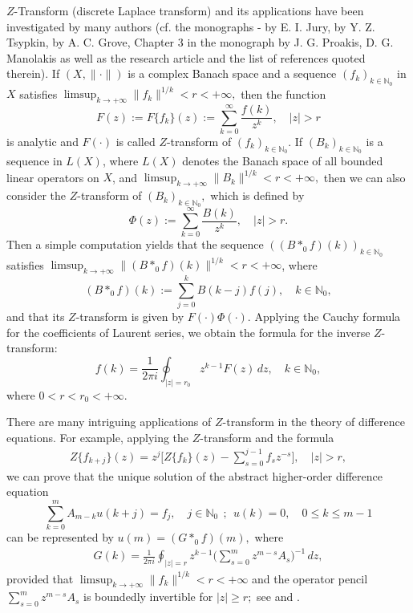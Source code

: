 \documentclass{amsart}
\theoremstyle{definition}
\theoremstyle{remark}
\numberwithin{equation}{section}
\begin{document}
$Z$-Transform  (discrete Laplace transform) and its applications have been investigated by many authors (cf. the  monographs \cite{jury1}-\cite{jury} by  E. I. Jury, \cite{chip} by Y. Z. Tsypkin, \cite{grove} by A. C. Grove, Chapter 3 in the monograph \cite{4949} by J. G. Proakis, D. G. Manolakis as well as the research article \cite{bohnert} and  the list of references quoted therein). 
If $(X,\| \cdot \|)$ is a complex Banach space and a sequence $(f_{k})_{k\in {\mathbb N}_{0}}$ in $X$ satisfies $\limsup_{k\rightarrow +\infty}\| f_{k}\|^{1/k}<r<+\infty,$ then the function
$$
F(z):=F\bigl\{f_{k}\bigr\}(z):=\sum_{k=0}^{\infty}\frac{f(k)}{z^{k}},\quad |z|>r
$$
is analytic and $F(\cdot)$ is called $Z$-transform of $(f_{k})_{k\in {\mathbb N}_{0}}.$ If $(B_{k})_{k\in {\mathbb N}_{0}}$ is a sequence in $L(X)$, where $L(X)$ denotes the Banach space of all bounded linear operators on $X$, and $\limsup_{k\rightarrow +\infty}\| B_{k}\|^{1/k}<r<+\infty,$ then we can also consider the $Z$-transform of $(B_{k})_{k\in {\mathbb N}_{0}},$ which is defined by
$$
\Phi(z):=\sum_{k=0}^{\infty}\frac{B(k)}{z^{k}},\quad |z|>r.
$$
Then a simple computation yields that the sequence $((B\ast_{0} f)(k))_{k\in {\mathbb N}_{0}}$ satisfies $\limsup_{k\rightarrow +\infty}\| (B\ast_{0} f)(k)\|^{1/k}<r<+\infty$, where $$(B\ast_{0} f)(k):=\sum_{j=0}^{k}B(k-j)f(j),\quad k\in {\mathbb N}_{0},$$ and that its $Z$-transform is given by $F(\cdot)\Phi(\cdot).$ 
Applying the Cauchy formula for the coefficients of Laurent series, we obtain the formula for the inverse $Z$-transform:
$$
f(k)=\frac{1}{2\pi i}\oint_{|z|=r_{0}}z^{k-1}F(z)\, dz,\quad k\in {\mathbb N}_{0},
$$
where $0<r<r_{0}<+\infty.$

There are many intriguing applications of $Z$-transform in the theory of difference equations. For example, applying the $Z$-transform and the formula
\begin{align}\label{shift1}
Z\{f_{k+j}\}(z)=z^{j}\Biggl[Z\{f_{k}\}(z)-\sum_{s=0}^{j-1}f_{s}z^{-s} \Biggr],\quad |z|>r,
\end{align} 
we can prove
that the unique
solution of the abstract higher-order difference equation
$$
\sum_{k=0}^{m}A_{m-k}u(k+j)=f_{j},\quad j\in {\mathbb N}_{0}\ \ ; \ \ u(k)=0,\quad 0\leq k\leq m-1
$$
can be represented by $u(m)=(G\ast_{0} f)(m),$ where
\begin{align}\label{giligili}
G(k)=\frac{1}{2\pi i}\oint_{|z|=r}z^{k-1}\Biggl(\sum_{s=0}^{m}z^{m-s}A_{s}\Biggr)^{-1}\, dz,
\end{align}
provided that $\limsup_{k\rightarrow +\infty}\| f_{k}\|^{1/k}<r<+\infty$ and the operator pencil $\sum_{s=0}^{m}z^{m-s}A_{s}$ is boundedly invertible for $|z|\geq r;$ see \cite[Theorem 13.2.1]{gil} and \cite{fcaa2025}.
\end{document}
